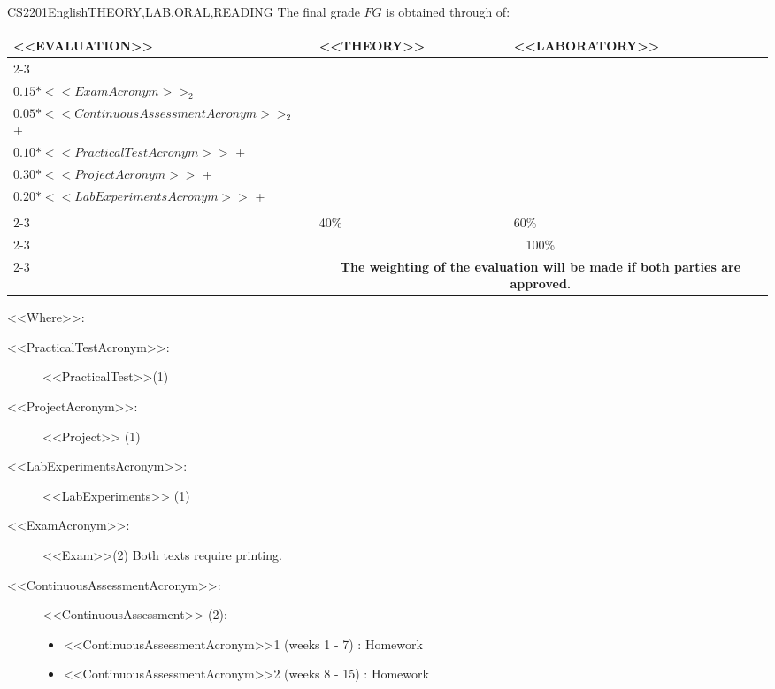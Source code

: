   \begin{evaluation}{CS2201}{English}{THEORY,LAB,ORAL,READING}
  The final grade $FG$ is obtained through of:
 
  \begin{tabularx}{0.9\textwidth}{|X|p{}|p{}|} \hline
  \multirow{4}{*}{\uppercase{<<Evaluation>>}} & \uppercase{<<Theory>>} & \uppercase{<<Laboratory>>} \\ \cline{2-3}
  & %
      \begin{minipage}{0.95\textwidth}
      \begin{tabular}{l}
          $0.15*<<ExamAcronym>>_{1}$ + \\
          $0.15*<<ExamAcronym>>_{2}$
          \end{tabular} 
      \end{minipage} 
  & %
      \begin{minipage}{0.95\textwidth}
      \begin{tabular}{l}
          $0.05*<<ContinuousAssessmentAcronym>>_{1}$ + \\
          $0.05*<<ContinuousAssessmentAcronym>>_{2}$ + \\
          $0.10*<<PracticalTestAcronym>>$ + \\
          $0.30*<<ProjectAcronym>>$ + \\
          $0.20*<<LabExperimentsAcronym>>$ + \\
      \end{tabular} 
      \end{minipage}                 \\ \cline{2-3}
  & %
  40\% 
  & %
  60\% \\ \cline{2-3}
  & \multicolumn{2}{c|}{100\%}  \\ \cline{2-3}
  & \multicolumn{2}{c|}{\textbf{\textbf{The weighting of the evaluation will be made if both parties are approved.}}}  \\ \hline
  \end{tabularx}
    
  \vspace{2mm}
  \noindent <<Where>>:
  \begin{description}
    \item[<<PracticalTestAcronym>>:] <<PracticalTest>>(1)
    \item[<<ProjectAcronym>>:]  <<Project>> (1)
    \item[<<LabExperimentsAcronym>>:] <<LabExperiments>> (1)
    \item[<<ExamAcronym>>:] <<Exam>>(2) Both texts require printing.
    \item[<<ContinuousAssessmentAcronym>>:] <<ContinuousAssessment>> (2):
      \begin{itemize}
          \item  <<ContinuousAssessmentAcronym>>1 (weeks 1 - 7) : Homework
          \item <<ContinuousAssessmentAcronym>>2 (weeks 8 - 15) : Homework 
      \end{itemize}
  \end{description}


\end{evaluation}
